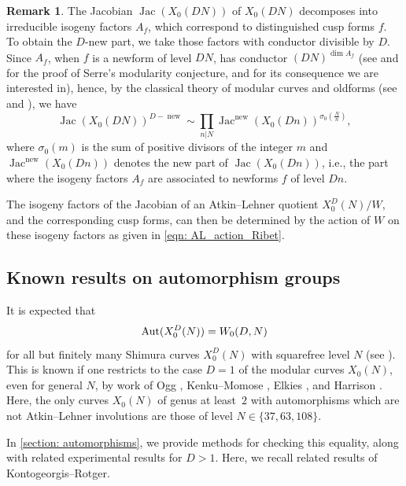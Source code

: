 \documentclass[11pt,reqno]{amsart}
\newcommand{\Jac}{\operatorname{Jac}}
\newcommand{\new}{\operatorname{new}}
\theoremstyle{definition}
\newtheorem{remark}[theorem]{Remark}
\newcommand{\Pietro}[1]{{\color{orange}{??Pietro: #1}}} %
\begin{document}
\begin{remark}
The Jacobian $\Jac(X_0(DN))$ of $X_0(DN)$ decomposes into irreducible isogeny factors $A_f$, which correspond to distinguished cusp forms $f$. To obtain the $D$-new part, we take those factors with conductor divisible by $D$. Since $A_f$, when $f$ is a newform of level $DN$, has conductor $(DN)^{\dim A_f}$ (see \cite{KW09a} and \cite{KW09b} for the proof of Serre's modularity conjecture, and \cite[Théorème~5]{Ser87} for its consequence we are interested in), 
hence, by the classical theory of modular curves and oldforms (see \cite[Theorem~5]{AL70} and \cite[Chapters~5 and 6]{DS05}), we have
\begin{equation*}
\Jac(X_0(DN))^{D-\new} \sim\prod_{n|N}\Jac^{\new}(X_0(Dn))^{\sigma_0\left(\frac{N}{n}\right)},
\end{equation*}
where $\sigma_0(m)$ is the sum of positive divisors of the integer $m$ and $\Jac^{\new}(X_0(Dn))$ denotes the new part of $\Jac(X_0(Dn))$, i.e., the part where the isogeny factors $A_f$ are associated to newforms $f$ of level $Dn$. 

The isogeny factors of the Jacobian of an Atkin--Lehner quotient $X_0^D(N)/W$, and the corresponding cusp forms, can then be determined by the action of $W$ on these isogeny factors as given in \cref{eqn: AL_action_Ribet}. 
\end{remark}


\subsection{Known results on automorphism groups}\label{subsection: auts}

It is expected that
\begin{equation}\label{eq:aut_conj}
\textnormal{Aut}(X_0^D(N)) = W_0(D,N)
\end{equation}
for all but finitely many Shimura curves $X_0^D(N)$ with squarefree level $N$ (see \cite[Conjecture 1.1]{KR08}). This is known if one restricts to the case $D=1$ of the modular curves $X_0(N)$, even for general $N$, by work of Ogg \cite{Ogg77}, Kenku--Momose \cite{KM88}, Elkies \cite{Elkies90}, and Harrison \cite{Har11}. Here, the only curves $X_0(N)$ of genus at least~$2$ with automorphisms which are not Atkin--Lehner involutions are those of level $N \in \{ 37, 63,108 \}$. %

In \cref{section: automorphisms}, we provide methods for checking this equality, along with related experimental results for $D>1$. Here, we recall related results of Kontogeorgis--Rotger. 
\end{document}
